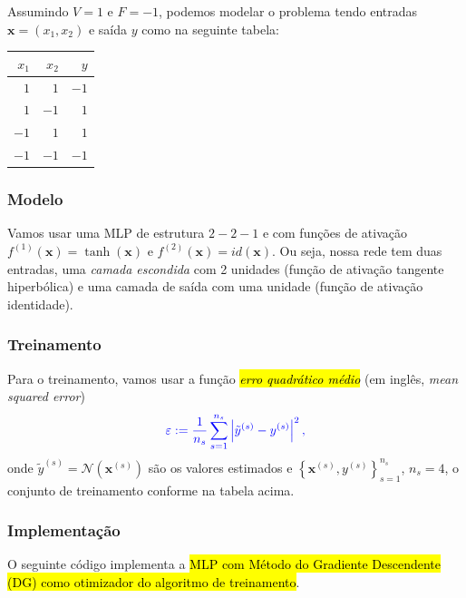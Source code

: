 Assumindo $V = 1$ e $F = -1$, podemos modelar o problema tendo entradas $\pmb{x} = (x_1, x_2)$ e saída $y$ como na seguinte tabela:

\begin{center}
  \begin{tabular}{rr|r}
    $x_1$ & $x_2$ & $y$ \\\hline
    $1$ & $1$ & $-1$ \\
    $1$ & $-1$ & $1$ \\
    $-1$ & $1$ & $1$ \\
    $-1$ & $-1$ & $-1$ \\\hline
  \end{tabular}
\end{center}

\subsubsection{Modelo}

Vamos usar uma MLP de estrutura $2-2-1$ e com funções de ativação $f^{(1)}(\pmb{x}) = \tanh(\pmb{x})$ e $f^{(2)}(\pmb{x}) = id(\pmb{x})$. Ou seja, nossa rede tem duas entradas, uma \emph{camada escondida} com 2 unidades (função de ativação tangente hiperbólica) e uma camada de saída com uma unidade (função de ativação identidade).

\subsubsection{Treinamento}

Para o treinamento, vamos usar a função \hl{\emph{erro quadrático médio}} (em inglês, \textit{mean squared error})
\begin{equation}\color{blue}\varepsilon := \frac{1}{n_s}\sum_{s=1}^{n_s}\left|\tilde{y}^{(s)} - y^{(s)}\right|^2,
\end{equation}
onde $\tilde{y}^{(s)} = \mathcal{N}\left(\pmb{x}^{(s)}\right)$ são os valores estimados e $\left\{\pmb{x}^{(s)}, y^{(s)}\right\}_{s=1}^{n_s}$, $n_s=4$, o conjunto de treinamento conforme na tabela acima.

\subsubsection{Implementação}

O seguinte código implementa a \hl{MLP com Método do Gradiente Descendente (DG) como otimizador do algoritmo de treinamento}.

